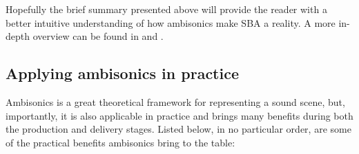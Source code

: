 Hopefully the brief summary presented above will provide 
the reader with a better intuitive understanding of how ambisonics make SBA a reality.
A more in-depth overview can be found in \cite{ambisonics_practical_theory} and
\cite{rafaely_spherical_array_processing}.

\subsection{Applying ambisonics in practice}

Ambisonics is a great theoretical framework for representing a sound scene, but, importantly, it is
also applicable in practice and brings many benefits during both the production and delivery stages.
Listed below, in no particular order, are some of the practical benefits ambisonics bring to the table:

